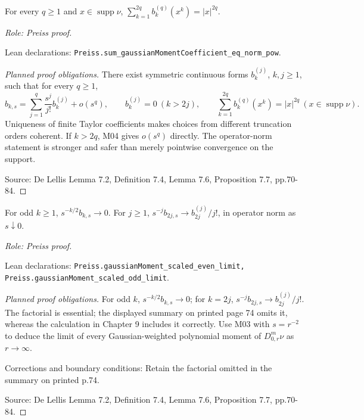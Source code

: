 \begin{lemma}
\label{lem:moment-support-polynomial}







For every $q\geq1$ and $x\in\operatorname{supp}\nu$, $\sum_{k=1}^{2q}b_k^{(q)}(x^k)=|x|^{2q}$.
\par\emph{Role: Preiss proof.}
\par Lean declarations: \texttt{Preiss.sum\_gaussianMomentCoefficient\_eq\_norm\_pow}.
\end{lemma}
\begin{proof}[Planned proof obligations]

There exist symmetric continuous forms $b_k^{(j)}$, $k,j\geq1$, such that for
every $q\geq1$,
\[
 b_{k,s}=\sum_{j=1}^{q}\frac{s^j}{j!}b_k^{(j)}+o(s^q),\qquad
 b_k^{(j)}=0\ (k>2j),\qquad
 \sum_{k=1}^{2q}b_k^{(q)}(x^k)=|x|^{2q}\ (x\in\operatorname{supp}\nu).
\]
Uniqueness of finite Taylor coefficients makes choices from different truncation
orders coherent. If $k>2q$, M04 gives $o(s^q)$ directly. The operator-norm
statement is stronger and safer than merely pointwise convergence on the support.
\par Source: De Lellis Lemma 7.2, Definition 7.4, Lemma 7.6, Proposition 7.7, pp.70-84.
\end{proof}

\begin{lemma}
\label{lem:scaled-moment-limits}





For odd $k\geq1$, $s^{-k/2}b_{k,s}\to0$. For $j\geq1$, $s^{-j}b_{2j,s}\to b_{2j}^{(j)}/j!$, in operator norm as $s\downarrow0$.
\par\emph{Role: Preiss proof.}
\par Lean declarations: \texttt{Preiss.gaussianMoment\_scaled\_even\_limit, Preiss.gaussianMoment\_scaled\_odd\_limit}.
\end{lemma}
\begin{proof}[Planned proof obligations]

For odd $k$, $s^{-k/2}b_{k,s}\to0$; for $k=2j$,
$s^{-j}b_{2j,s}\to b_{2j}^{(j)}/j!$.
The factorial is essential; the displayed summary on printed page 74 omits it,
whereas the calculation in Chapter 9 includes it correctly.
Use M03 with $s=r^{-2}$ to deduce the limit of every Gaussian-weighted
polynomial moment of $D^m_{0,r}\nu$ as $r\to\infty$.
\par Corrections and boundary conditions: Retain the factorial omitted in the summary on printed p.74.
\par Source: De Lellis Lemma 7.2, Definition 7.4, Lemma 7.6, Proposition 7.7, pp.70-84.
\end{proof}

